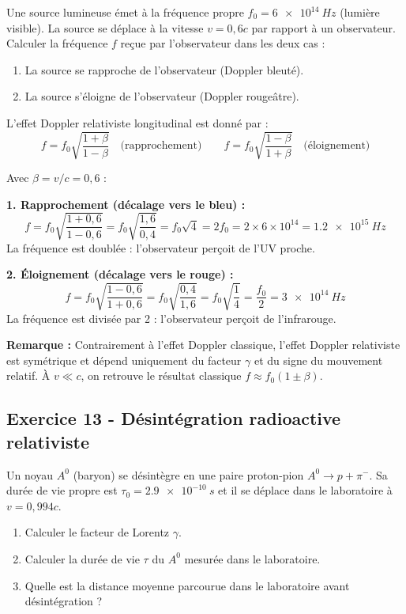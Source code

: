 \documentclass[12pt,a4paper]{article}
\begin{document}
\begin{boiteexercice}
Une source lumineuse émet à la fréquence propre $f_0 = \qty{6e14}{Hz}$ (lumière visible). La source se déplace à la vitesse $v = 0{,}6c$ par rapport à un observateur. Calculer la fréquence $f$ reçue par l'observateur dans les deux cas :
\begin{enumerate}
  \item La source se rapproche de l'observateur (Doppler bleuté).
  \item La source s'éloigne de l'observateur (Doppler rougeâtre).
\end{enumerate}
L'effet Doppler relativiste longitudinal est donné par :
\[
f = f_0\sqrt{\frac{1+\beta}{1-\beta}} \quad \text{(rapprochement)} \qquad f = f_0\sqrt{\frac{1-\beta}{1+\beta}} \quad \text{(éloignement)}
\]
\end{boiteexercice}

\begin{boitecorrige}
Avec $\beta = v/c = 0{,}6$ :

\textbf{1. Rapprochement (décalage vers le bleu) :}
\[
f = f_0\sqrt{\frac{1+0{,}6}{1-0{,}6}} = f_0\sqrt{\frac{1{,}6}{0{,}4}} = f_0\sqrt{4} = 2f_0 = 2\times6\times10^{14} = \qty{1.2e15}{Hz}
\]
La fréquence est doublée : l'observateur perçoit de l'UV proche.

\textbf{2. Éloignement (décalage vers le rouge) :}
\[
f = f_0\sqrt{\frac{1-0{,}6}{1+0{,}6}} = f_0\sqrt{\frac{0{,}4}{1{,}6}} = f_0\sqrt{\frac{1}{4}} = \frac{f_0}{2} = \qty{3e14}{Hz}
\]
La fréquence est divisée par 2 : l'observateur perçoit de l'infrarouge.

\textbf{Remarque :} Contrairement à l'effet Doppler classique, l'effet Doppler relativiste est symétrique et dépend uniquement du facteur $\gamma$ et du signe du mouvement relatif. À $v\ll c$, on retrouve le résultat classique $f\approx f_0(1\pm\beta)$.
\end{boitecorrige}

\subsection*{Exercice 13 - Désintégration radioactive relativiste \niveau{\moyen}}

\begin{boiteexercice}
Un noyau $A^0$ (baryon) se désintègre en une paire proton-pion $A^0\to p + \pi^-$. Sa durée de vie propre est $\tau_0 = \qty{2.9e-10}{s}$ et il se déplace dans le laboratoire à $v = 0{,}994c$.
\begin{enumerate}
  \item Calculer le facteur de Lorentz $\gamma$.
  \item Calculer la durée de vie $\tau$ du $A^0$ mesurée dans le laboratoire.
  \item Quelle est la distance moyenne parcourue dans le laboratoire avant désintégration ?
\end{enumerate}
\end{boiteexercice}
\end{document}
